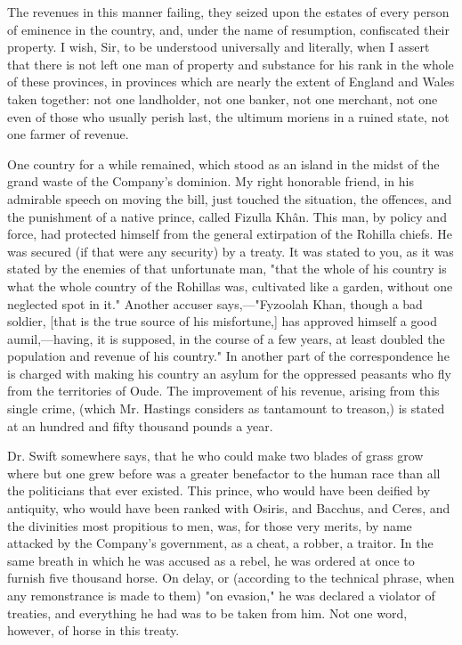 The revenues in this manner failing, they seized upon the estates of every person of eminence in the country, and, under the name of resumption, confiscated their property. I wish, Sir, to be understood universally and literally, when I assert that there is not left one man of property and substance for his rank in the whole of these provinces, in provinces which are nearly the extent of England and Wales taken together: not one landholder, not one banker, not one merchant, not one even of those who usually perish last, the ultimum moriens in a ruined state, not one farmer of revenue.

One country for a while remained, which stood as an island in the midst of the grand waste of the Company's dominion. My right honorable friend, in his admirable speech on moving the bill, just touched the situation, the offences, and the punishment of a native prince, called Fizulla Khân. This man, by policy and force, had protected himself from the general extirpation of the Rohilla chiefs. He was secured (if that were any security) by a treaty. It was stated to you, as it was stated by the enemies of that unfortunate man, "that the whole of his country is what the whole country of the Rohillas was, cultivated like a garden, without one neglected spot in it." Another accuser says,—"Fyzoolah Khan, though a bad soldier, [that is the true source of his misfortune,] has approved himself a good aumil,—having, it is supposed, in the course of a few years, at least doubled the population and revenue of his country." In another part of the correspondence he is charged with making his country an asylum for the oppressed peasants who fly from the territories of Oude. The improvement of his revenue, arising from this single crime, (which Mr. Hastings considers as tantamount to treason,) is stated at an hundred and fifty thousand pounds a year.

Dr. Swift somewhere says, that he who could make two blades of grass grow where but one grew before was a greater benefactor to the human race than all the politicians that ever existed. This prince, who would have been deified by antiquity, who would have been ranked with Osiris, and Bacchus, and Ceres, and the divinities most propitious to men, was, for those very merits, by name attacked by the Company's government, as a cheat, a robber, a traitor. In the same breath in which he was accused as a rebel, he was ordered at once to furnish five thousand horse. On delay, or (according to the technical phrase, when any remonstrance is made to them) "on evasion," he was declared a violator of treaties, and everything he had was to be taken from him. Not one word, however, of horse in this treaty.

